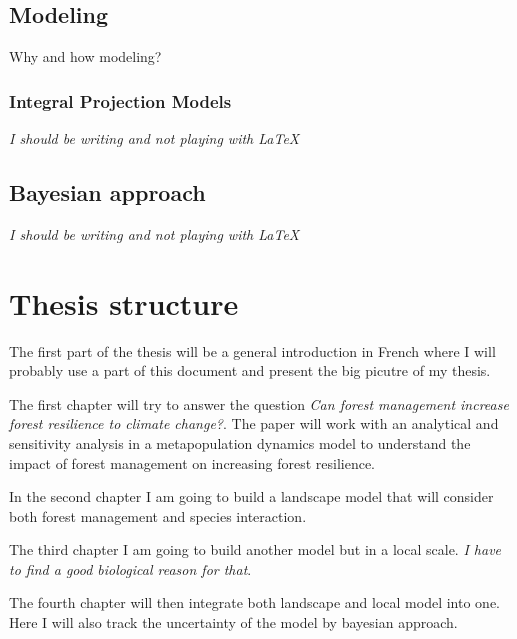 \subsection*{Modeling}

Why and how modeling?

\subsubsection*{Integral Projection Models}

\textit{I should be writing and not playing with \LaTeX}

\subsection*{Bayesian approach}

\textit{I should be writing and not playing with \LaTeX}

\section{Thesis structure}

The first part of the thesis will be a general introduction in French where  I will probably use a part of this document and present the big picutre of my thesis.

The first chapter will try to answer the question \textit{Can forest management increase forest resilience to climate change?}. The paper will work with an analytical and sensitivity analysis in a metapopulation dynamics model to understand the impact of forest management on increasing forest resilience.

In the second chapter I am going to build a landscape model that will consider both forest management and species interaction.

The third chapter I am going to build another model but in a local scale. \textit{I have to find a good biological reason for that}.

The fourth chapter will then integrate both landscape and local model into one. Here I will also track the uncertainty of the model by bayesian approach.





